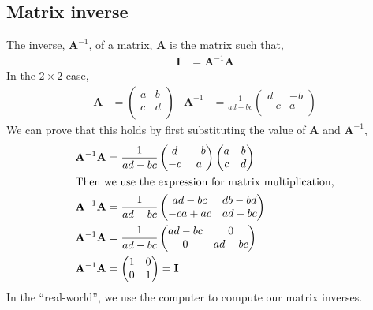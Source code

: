 \documentclass{article}
\newcommand{\A}{\mathbf{A}}
\newcommand{\I}{\mathbf{I}}
\begin{document}
\subsection{Matrix inverse}
The inverse, $\A^{-1}$, of a matrix, $\A$ is the matrix such that,
\begin{align}
  \I &= \A^{-1} \A
\end{align}
In the $2\times 2$ case,
\begin{align}
  \A &= \begin{pmatrix}
    a & b \\
    c & d \\
  \end{pmatrix} &
  \A^{-1} &= \frac{1}{ad-bc} \begin{pmatrix}
    d & -b \\
    -c & a \\
  \end{pmatrix}
\end{align}
We can prove that this holds by first substituting the value of $\A$ and $\A^{-1}$,
\begin{align}
    \A^{-1} \A &= \frac{1}{ad-bc} \begin{pmatrix}
    d & -b \\
    -c & a \\
  \end{pmatrix}
  \begin{pmatrix}
    a & b \\
    c & d \\
  \end{pmatrix}\\
  \intertext{Then we use the expression for matrix multiplication,}
  \A^{-1} \A &= \frac{1}{ad-bc} \begin{pmatrix}
    ad - bc & db - bd \\
    -ca + ac & ad - bc
  \end{pmatrix}\\
  \A^{-1} \A &= \frac{1}{ad-bc} \begin{pmatrix}
    ad - bc & 0 \\
    0 & ad - bc
  \end{pmatrix}\\
  \A^{-1} \A &= \begin{pmatrix}
    1 & 0 \\
    0 & 1 \\
  \end{pmatrix} = \I
\end{align}
In the ``real-world'', we use the computer to compute our matrix inverses.
\end{document}
